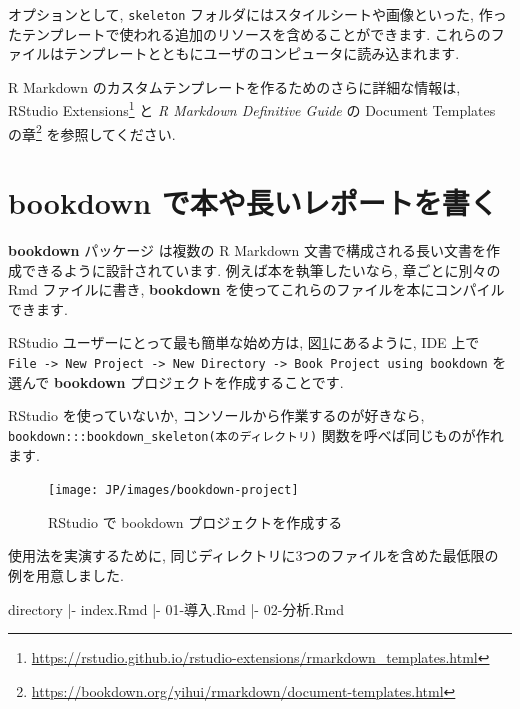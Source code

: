 \documentclass[
  11pt,
  lualatex,ja=standard,jafont=noto]{bxjsreport}
\newenvironment{Shaded}{\begin{snugshade}}{\end{snugshade}}
\newcommand{\NormalTok}[1]{#1}
\renewcommand{\href}[2]{#2\footnote{\url{#1}}}
\begin{document}
オプションとして, \texttt{skeleton} フォルダにはスタイルシートや画像といった, 作ったテンプレートで使われる追加のリソースを含めることができます. これらのファイルはテンプレートとともにユーザのコンピュータに読み込まれます.

R Markdown のカスタムテンプレートを作るためのさらに詳細な情報は, \href{https://rstudio.github.io/rstudio-extensions/rmarkdown_templates.html}{RStudio Extensions} と \emph{R Markdown Definitive Guide} \autocite{rmarkdown2018} の \href{https://bookdown.org/yihui/rmarkdown/document-templates.html}{Document Templates の章} を参照してください.

\hypertarget{bookdown}{%
\section{\texorpdfstring{\textbf{bookdown} で本や長いレポートを書く}{bookdown で本や長いレポートを書く}}\label{bookdown}}

\textbf{bookdown} パッケージ \autocite{R-bookdown} は複数の R Markdown 文書で構成される長い文書を作成できるように設計されています. 例えば本を執筆したいなら, 章ごとに別々の Rmd ファイルに書き, \textbf{bookdown} を使ってこれらのファイルを本にコンパイルできます.

RStudio ユーザーにとって最も簡単な始め方は, 図\ref{fig:bookdown-project}にあるように, IDE 上で \texttt{File -\textgreater{}\ New\ Project\ -\textgreater{}\ New\ Directory\ -\textgreater{}\ Book\ Project\ using\ bookdown} を選んで \textbf{bookdown} プロジェクトを作成することです.

RStudio を使っていないか, コンソールから作業するのが好きなら, \texttt{bookdown:::bookdown\_skeleton(\textquotesingle{}本のディレクトリ\textquotesingle{})} 関数を呼べば同じものが作れます.

\begin{figure}

{\centering \texttt{[image: JP/images/bookdown-project]} 

}

\caption{RStudio で bookdown プロジェクトを作成する}\label{fig:bookdown-project}
\end{figure}

使用法を実演するために, 同じディレクトリに3つのファイルを含めた最低限の例を用意しました.

\begin{Shaded}
\begin{Highlighting}[]
\NormalTok{directory}
\NormalTok{  |{-} index.Rmd}
\NormalTok{  |{-} 01{-}導入.Rmd}
\NormalTok{  |{-} 02{-}分析.Rmd}
\end{Highlighting}
\end{Shaded}
\end{document}

